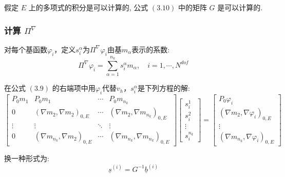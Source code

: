     假定 $E$ 上的多项式的积分是可以计算的, 公式 $(3.10)$ 中的矩阵 $G$ 是可以计算的. \\
    \subsubsection{计算 $\Pi^{\nabla}$}

对每个基函数$\varphi_i$，定义$s_i^{\alpha}$为$\Pi^{\nabla}\varphi_i$由基$m_{\alpha}$表示的系数: \\
\begin{equation}
\Pi^\nabla \varphi_i = \sum_{\alpha = 1}^{n_k}s_{i}^{\alpha}m_\alpha,\quad i = 1,\cdots,N^{dof}
\end{equation}

在公式 $(3.9)$ 的右端项中用$\varphi_i$代替$v_h$，$s_i^{\alpha}$是下列方程的解: \\
\begin{equation*}
 \left[\begin{array}{cccc}
P_0m_1 & P_0m_1 &\cdots&P_0m_{n_k} \\
0 & (\nabla m_2,\nabla m_2)_{0,E} & \cdots & (\nabla m_2,\nabla m_{n_k})_{0,E} \\
\vdots & \vdots & \ddots & \vdots\\
0& (\nabla m_{n_k},\nabla m_2)_{0,E} & \cdots & (\nabla m_{n_k},\nabla m_{n_k})_{0,E}
\end{array}\right]
\left[\begin{array}{c}
s_i^1\\
s_i^2\\
\vdots\\
s_i^{n_k}
\end{array}\right]
= \left[\begin{array}{c}
P_0\varphi_i\\
(\nabla m_2,\nabla \varphi_i)_{0,E} \\
\vdots\\
(\nabla m_{n_k},\nabla \varphi_i)_{0,E}
\end{array}\right]
\end{equation*}

换一种形式为: \\
\begin{equation*}
\underline s^{(i)} = G^{-1}\underline b^{(i)}
\end{equation*}

